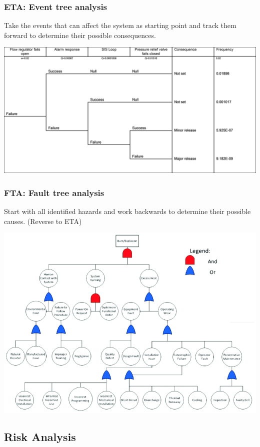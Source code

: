 \documentclass[
  10pt,
  a4paper,
]{article}
\begin{document}
\begin{multicols*}{2}
\subsubsection{ETA: Event tree analysis}\label{eta-event-tree-analysis}

Take the events that can affect the system as starting point and track
them forward to determine their possible consequences.

\includegraphics{images/safety/image-1.png}

\subsubsection{FTA: Fault tree analysis}\label{fta-fault-tree-analysis}

Start with all identified hazards and work backwards to determine their
possible causes. (Reverse to ETA)

\includegraphics{images/safety/image-2.png}

\subsection{Risk Analysis}\label{risk-analysis}


\end{multicols*}
\end{document}
